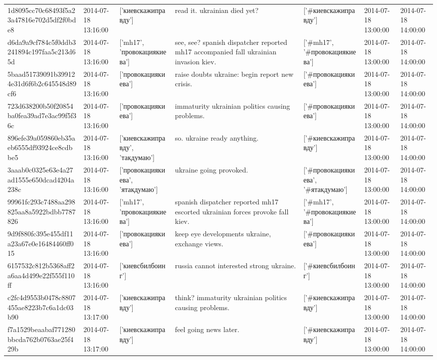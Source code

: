 \begin{tabular}{lllllll}
1d8095cc70c68493f5a23a47816e702d5df2f0bde8 & 2014-07-18 13:16:00 & ['киевскажиправду'] & read it. ukrainian died yet? & ['#киевскажиправду'] & 2014-07-18 13:00:00 & 2014-07-18 14:00:00 \\
d6da9a9cf784c5f0ddb3241894c197faa5c213d65d & 2014-07-18 13:16:00 & ['mh17', 'провокациякиева'] & see, see? spanish dispatcher reported mh17 accompanied fall ukrainian invasion kiev. & ['#mh17', '#провокациякиева'] & 2014-07-18 13:00:00 & 2014-07-18 14:00:00 \\
5baad51739091b399124e31d6f6b2c645548d89cf6 & 2014-07-18 13:16:00 & ['провокациякиева'] & raise doubts ukraine: begin report new crisis. & ['#провокациякиева'] & 2014-07-18 13:00:00 & 2014-07-18 14:00:00 \\
723d638200b50f20854ba0fea39ad7e3ac99f5f36c & 2014-07-18 13:16:00 & ['провокациякиева'] & immaturity ukrainian politics causing problems. & ['#провокациякиева'] & 2014-07-18 13:00:00 & 2014-07-18 14:00:00 \\
896efe39a059860eb35aeb6555df93924ce8cdbbe5 & 2014-07-18 13:16:00 & ['киевскажиправду', 'такдумаю'] & so. ukraine ready anything. & ['#киевскажиправду'] & 2014-07-18 13:00:00 & 2014-07-18 14:00:00 \\
3aaab0c0325e63e4a27ad1555e650dcad4204a238c & 2014-07-18 13:16:00 & ['провокациякиева', 'ятакдумаю'] & ukraine going provoked. & ['#провокациякиева', '#ятакдумаю'] & 2014-07-18 13:00:00 & 2014-07-18 14:00:00 \\
99961fc293c7488aa298825aa8a5922bdbb7787826 & 2014-07-18 13:16:00 & ['mh17', 'провокациякиева'] & spanish dispatcher reported mh17 escorted ukrainian forces provoke fall kiev. & ['#mh17', '#провокациякиева'] & 2014-07-18 13:00:00 & 2014-07-18 14:00:00 \\
9d9f880fc395e455df11a23a67e0e16484460ff015 & 2014-07-18 13:16:00 & ['провокациякиева'] & keep eye developments ukraine, exchange views. & ['#провокациякиева'] & 2014-07-18 13:00:00 & 2014-07-18 14:00:00 \\
6157532c812b5368aff2a6aa4d499e22f555f110ff & 2014-07-18 13:16:00 & ['киевсбилбоинг'] & russia cannot interested strong ukraine. & ['#киевсбилбоинг'] & 2014-07-18 13:00:00 & 2014-07-18 14:00:00 \\
c2fc4d9553b0478c8807455ae8223b7c6a1dc03b90 & 2014-07-18 13:17:00 & ['киевскажиправду'] & think? immaturity ukrainian politics causing problems. & ['#киевскажиправду'] & 2014-07-18 13:00:00 & 2014-07-18 14:00:00 \\
f7a1529beaabaf771280bbcda762b0763ae25f429b & 2014-07-18 13:17:00 & ['киевскажиправду'] & feel going news later. & ['#киевскажиправду'] & 2014-07-18 13:00:00 & 2014-07-18 14:00:00 \\

\end{tabular}
